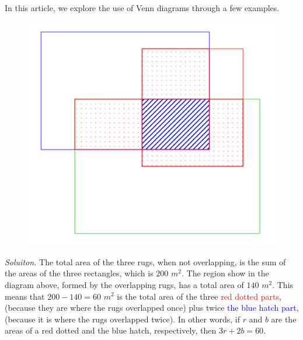\begin{multicols}{2}
	In this article, we explore the use of Venn diagrams through a few examples.
	\vskip 0.2cm
	\vskip 0.1cm
	\begin{figure}[H]
		\vspace*{-5pt}
		\centering
		\captionsetup{labelformat= empty, justification=centering}
		\includegraphics[width= 1\linewidth]{pi-2023-01-01.pdf}
		\vspace*{-10pt}
	\end{figure}
	\textit{Soluiton.}
	The total area of the three rugs, when not overlapping, is the sum of the areas of the three rectangles, which is $200$ $m^2.$
	The region show in the diagram above, formed by the overlapping rugs, has a total area of $140$ $m^2.$
	This means that $200-140=60$ $m^2$ is the total area of the three \textcolor{red}{red dotted parts},
	(because they are where the rugs overlapped once) plus twice \textcolor{blue}{the blue hatch part},
	(because it is where the rugs overlapped twice).
	\vskip 0.1cm
	In other words, if $r$ and $b$ are the areas of a red dotted and the blue hatch, respectively, then $3r + 2b = 60.$

\end{multicols}
